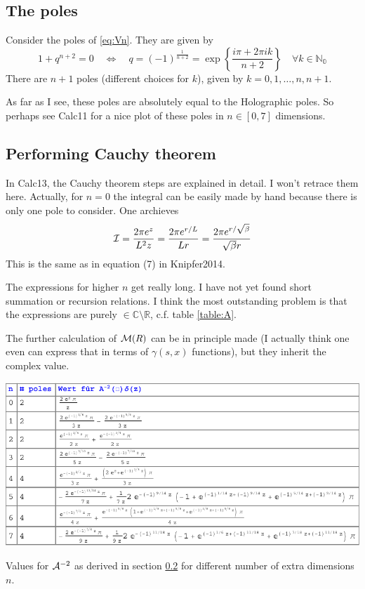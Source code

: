 \documentclass[10pt,a4paper, fleqn]{article}
\begin{document}
\subsection{The poles}
Consider the poles of \eqref{eq:Vn}. They are given by
\begin{equation}
1 + q^{n+2} = 0
\quad\Leftrightarrow\quad
q = (-1)^{\frac 1{n+2}}
=\exp\left\{
\frac{i\pi + 2\pi i k}{n+2}
\right\}
\quad
\forall k\in \mathbb{N_0}
\end{equation}
There are $n+1$ poles (different choices for $k$), given by $k=0,1,\dots,n,n+1$.

As far as I see, these poles are absolutely equal to the Holographic poles. So perhaps see Calc11 for a nice plot of these poles in $n\in[0,7]$ dimensions.

\subsection{Performing Cauchy theorem} \label{heading:cauchy1}
In Calc13, the Cauchy theorem steps are explained in detail. I won't retrace them here. Actually, for $n=0$ the integral can be easily made by hand because there is only one pole to consider. One archieves
\begin{equation}
{\cal I} = \frac{2\pi e^z}{L^2 z} = \frac{2\pi e^{r/L}}{L r}
= \frac{2 \pi e^{r/\sqrt{\beta}} }{\sqrt\beta r}
\end{equation}
This is the same as in equation (7) in Knipfer2014.

The expressions for higher $n$ get really long. I have not yet found short summation or recursion relations. I think the most outstanding
problem is that the expressions are purely $\in \mathbb{C} \setminus \mathbb{R}$, c.f. table \ref{table:A}.

The further calculation of ${\cal M}(R)$ can be in principle made (I actually think one even can express that in terms of $\gamma(s,x)$ functions), but they inherit the complex value.

\begin{table}
\includegraphics[width=\textwidth]{plots/A-table.pdf}
\caption{Values for ${\cal A}^{-2}$ as derived in section \ref{heading:cauchy1} for different number of extra dimensions $n$.}
\label{table:A}
\end{table}
\end{document}
